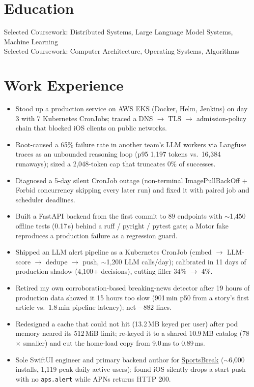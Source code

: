 \documentclass[11pt, letterpaper]{article}
\begin{document}

\section{Education}
Selected Coursework: Distributed Systems, Large Language Model Systems, Machine Learning\\[1pt]
Selected Coursework: Computer Architecture, Operating Systems, Algorithms

\section{Work Experience}
\begin{itemize}
  \item Stood up a production service on AWS EKS (Docker, Helm, Jenkins) on day 3 with 7 Kubernetes CronJobs; traced a DNS $\to$ TLS $\to$ admission-policy chain that blocked iOS clients on public networks.
  \item Root-caused a 65\% failure rate in another team's LLM workers via Langfuse traces as an unbounded reasoning loop (p95 1{,}197 tokens vs.\ 16{,}384 runaways); sized a 2{,}048-token cap that truncates 0\% of successes.
  \item Diagnosed a 5-day silent CronJob outage (non-terminal ImagePullBackOff + Forbid concurrency skipping every later run) and fixed it with paired job and scheduler deadlines.
  \item Built a FastAPI backend from the first commit to 89 endpoints with $\sim$1{,}450 offline tests (0.17\,s) behind a ruff / pyright / pytest gate; a Motor fake reproduces a production failure as a regression guard.
  \item Shipped an LLM alert pipeline as a Kubernetes CronJob (embed $\to$ LLM-score $\to$ dedupe $\to$ push, $\sim$1{,}200 LLM calls/day); calibrated in 11 days of production shadow (4{,}100+ decisions), cutting filler 34\% $\to$ 4\%.
  \item Retired my own corroboration-based breaking-news detector after 19 hours of production data showed it 15 hours too slow (901\,min p50 from a story's first article vs.\ 1.8\,min pipeline latency); net $-$882 lines.
  \item Redesigned a cache that could not hit (13.2\,MB keyed per user) after pod memory neared its 512\,MiB limit; re-keyed it to a shared 10.9\,MB catalog (78$\times$ smaller) and cut the home-load copy from 9.0\,ms to 0.89\,ms.
  \item Sole SwiftUI engineer and primary backend author for \href{https://apps.apple.com/app/id6762649287}{SportsBreak} ($\sim$6{,}000 installs, 1{,}119 peak daily active users); found iOS silently drops a start push with no \texttt{aps.alert} while APNs returns HTTP 200.
\end{itemize}
\end{document}
